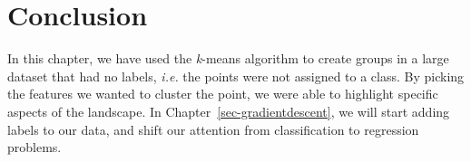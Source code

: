\documentclass[
  letterpaper,
]{scrbook}
\begin{document}
{
\makeatletter
\def\LT@makecaption#1#2#3{%
  \noalign{\smash{\hbox{\kern\textwidth\rlap{\kern\marginparsep
  \parbox[t]{\marginparwidth}{%
    \footnotesize{%
      \vspace{(1.1\baselineskip)}
    #1{#2: }\ignorespaces #3}}}}}}%
    }
\makeatother

\begin{figure}[bt]



\end{figure}%

}

\section{Conclusion}\label{conclusion}

In this chapter, we have used the \emph{k}-means algorithm to create
groups in a large dataset that had no labels, \emph{i.e.} the points
were not assigned to a class. By picking the features we wanted to
cluster the point, we were able to highlight specific aspects of the
landscape. In Chapter~\ref{sec-gradientdescent}, we will start adding
labels to our data, and shift our attention from classification to
regression problems.

\end{document}
